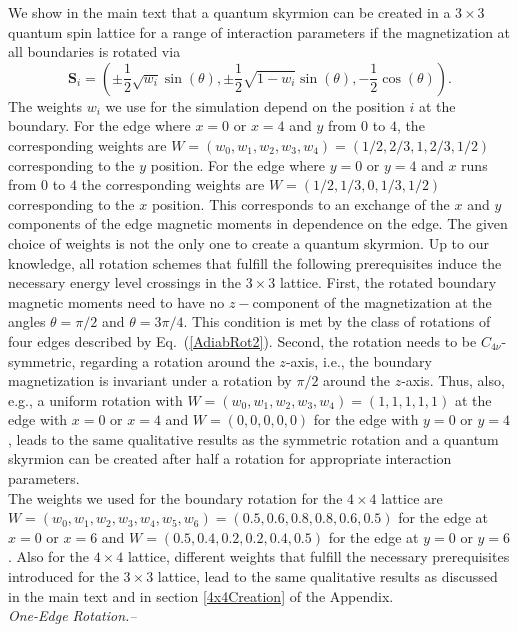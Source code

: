 \documentclass[reprint,aps,prb,superscriptaddress,10pt]{revtex4-2} %
\begin{document}
We show in the main text that a quantum skyrmion can be created in a $3\times3$ quantum spin lattice for a range of interaction parameters if the magnetization at all boundaries is rotated via
\begin{equation}\label{AdiabRot2}
\textbf{S}_{i}=\left(\pm\frac{1}{2}\sqrt{w_{i}}\sin(\theta),\pm\frac{1}{2}\sqrt{1-w_{i}}\sin(\theta),-\frac{1}{2}\cos(\theta)\right).
\end{equation}
The weights $w_i$ we use for the simulation depend on the position $i$ at the boundary. 
For the edge where $x=0$ or $x=4$ and $y$ from $0$ to $4$, the corresponding weights are $W=(w_0,w_1,w_2,w_3,w_4)=(1/2,2/3,1,2/3,1/2)$ corresponding to the $y$ position.
For the edge where $y=0$ or $y=4$ and $x$ runs from $0$ to $4$ the corresponding weights are $W=(1/2,1/3,0,1/3,1/2)$ corresponding to the $x$ position. This corresponds to an exchange of the $x$ and $y$ components of the edge magnetic moments in dependence on the edge.
The given choice of weights is not the only one to create a quantum skyrmion.
Up to our knowledge, all rotation schemes that fulfill the following prerequisites induce the necessary energy level crossings in the $3\times3$ lattice.
First, the rotated boundary magnetic moments need to have no $z-$component of the magnetization at the angles $\theta=\pi/2$ and $\theta=3\pi/4$. This condition is met by the class of rotations of four edges described by Eq.~(\ref{AdiabRot2}).
Second, the rotation needs to be $C_{4\nu}$-symmetric, regarding a rotation around the $z$-axis, i.e., the boundary magnetization is invariant under a rotation  by $\pi/2$ around the $z$-axis. 
Thus, also, e.g., a uniform rotation with $W=(w_0,w_1,w_2,w_3,w_4)=(1,1,1,1,1)$ at the edge with $x=0$ or $x=4$ and $W=(0,0,0,0,0)$ for the edge with $y=0$ or $y=4$, leads to the same qualitative results as the symmetric rotation and a quantum skyrmion can be created after half a rotation for appropriate interaction parameters.\\
The weights we used for the boundary rotation for the $4\times4$ lattice are $W=(w_0,w_1,w_2,w_3,w_4,w_5,w_6)=(0.5,0.6,\allowbreak 0.8, \allowbreak 0.8,0.6,0.5)$ for the edge at $x=0$ or $x=6$ and $W=(0.5,0.4,0.2,0.2,0.4,0.5)$ for the edge at $y=0$ or $y=6$. Also for the $4\times4$ lattice, different weights that fulfill the necessary prerequisites introduced for the $3\times3$ lattice, lead to the same qualitative results as discussed in the main text and in section \ref{4x4Creation} of the Appendix.\\
\textit{One-Edge Rotation.--}
\end{document}
